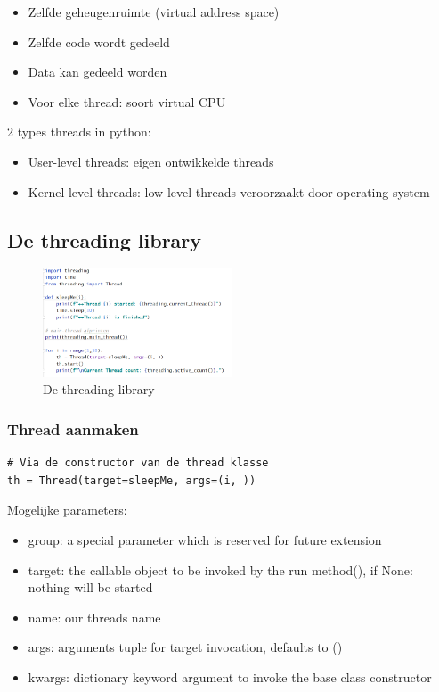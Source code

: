 \documentclass{article}
\begin{document}
\begin{itemize}
    \item Zelfde geheugenruimte (virtual address space)
    \item Zelfde code wordt gedeeld
    \item Data kan gedeeld worden
    \item Voor elke thread: soort virtual CPU
\end{itemize}

2 types threads in python:

\begin{itemize}
    \item User-level threads: eigen ontwikkelde threads
    \item Kernel-level threads: low-level threads veroorzaakt door operating system
\end{itemize}

\subsection{De threading library}

\begin{figure}[H]
    \centering
    \includegraphics[width=0.5\textwidth]{threading-demo.png}
    \caption{De threading library}
\end{figure}

\subsubsection{Thread aanmaken}

\begin{verbatim}
# Via de constructor van de thread klasse
th = Thread(target=sleepMe, args=(i, ))
\end{verbatim}

Mogelijke parameters:

\begin{itemize}
    \item group: a special parameter which is reserved for future extension
    \item target: the callable object to be invoked by the run method(), if None: nothing will be started
    \item name: our threads name
    \item args: arguments tuple for target invocation, defaults to ()
    \item kwargs: dictionary keyword argument to invoke the base class constructor
\end{itemize}
\end{document}
